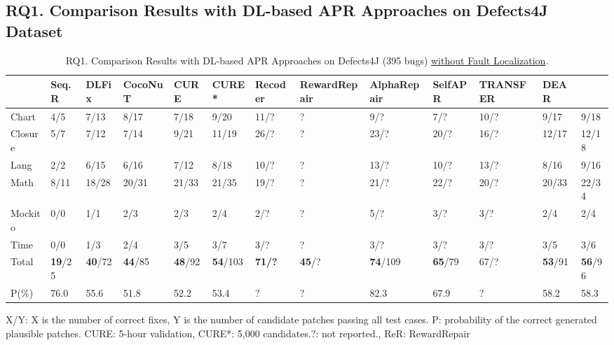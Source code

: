 \subsection{\bf RQ1. Comparison Results with DL-based APR Approaches on Defects4J Dataset}

\begin{table*}[t]
  \caption{RQ1. Comparison Results with DL-based APR Approaches on Defects4J (395 bugs) \underline {without Fault Localization}.}
  \vspace{-6pt}
  \tabcolsep 2.5pt
  {\footnotesize
			\begin{center}
				\renewcommand{\arraystretch}{1}
				\begin{tabular}{p{1cm}<{\centering}|p{1cm}<{\centering}|p{1cm}<{\centering}|p{1.5cm}<{\centering}|p{1cm}<{\centering}|p{1cm}<{\centering}|p{1cm}<{\centering}|p{2cm}<{\centering}|p{1.5cm}<{\centering}|p{1cm}<{\centering}|p{1.5cm}<{\centering}|p{1cm}<{\centering}|p{1cm}<{\centering}}
					
					\hline
					&\textbf{Seq.R}&\textbf{DLFix}& \textbf{CocoNuT}&\textbf{CURE}&\textbf{CURE*}&\textbf{Recoder}& {\bf RewardRepair} & \textbf{AlphaRepair}& \textbf{SelfAPR}& \textbf{TRANSFER}& {\bf DEAR} & \textbf{\tool}\\
					\hline
					Chart  & 4/5   & 7/13  & 8/17  & 7/18  & 9/20 & 11/? & ? & 9/? & 7/? & 10/?& 9/17 & 9/18\\
					Closure& 5/7   & 7/12  & 7/14  & 9/21 & 11/19  & 26/? & ? & 23/? & 20/? & 16/? & 12/17 & 12/18\\
					Lang   & 2/2   & 6/15  & 6/16  & 7/12 & 8/18 & 10/? & ? & 13/? & 10/? & 13/?&8/16 & 9/16\\
					Math    & 8/11  & 18/28 & 20/31 & 21/33 & 21/35 & 19/? & ? & 21/? & 22/? & 20/?&20/33 & 22/34\\
					Mockito & 0/0   & 1/1   & 2/3   & 2/3  &2/4 & 2/? & ? & 5/? & 3/? & 3/? &2/4 & 2/4\\
					Time    & 0/0   & 1/3   & 2/4   & 3/5  &3/7 & 3/? & ? & 3/? & 3/? & 3/?& 3/5 & 3/6\\
					\hline
					Total   & {\bf 19}/25 & {\bf 40}/72 & {\bf 44}/85 & {\bf 48}/92 & {\bf 54}/103 & {\bf 71/?} & {\bf 45}/? & {\bf 74}/109 & {\bf 65}/79 & 67/? &{\bf 53}/91 & {\bf 56}/96\\
					\hline
					P(\%)  & 76.0  & 55.6  & 51.8  & 52.2  &  53.4 & ? & ? & 82.3 & 67.9 & ? & 58.2 & 58.3\\
					\hline
				\end{tabular}
			{\footnotesize{
				X/Y: X is the number of correct fixes, Y is the number of candidate patches passing all test cases. P: probability of the correct generated plausible patches. CURE: 5-hour validation, CURE*: 5,000 candidates.?: not reported., ReR: RewardRepair}}


\end{center}}
\end{table*}
